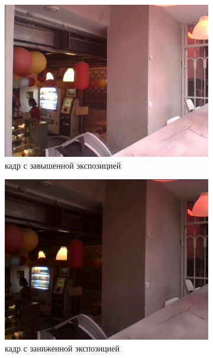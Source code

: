\begin{figure}[!tbp]
  \centering
  \begin{subfigure}{.5\textwidth}
    \includegraphics[width=\textwidth]{img/exposure1_cafe.png}
    \caption{ кадр с завышенной экспозицией}
    \label{fig:exposure1_cafe}
  \end{subfigure}\hfill
  \begin{subfigure}{.5\textwidth}
    \includegraphics[width=\textwidth]{img/exposure2_cafe.png}
    \caption{ кадр с заниженной экспозицией}
    \label{fig:exposure2_cafe}
  \end{subfigure}\hfill
  \begin{subfigure}{1\textwidth}

\end{subfigure}
\end{figure}
